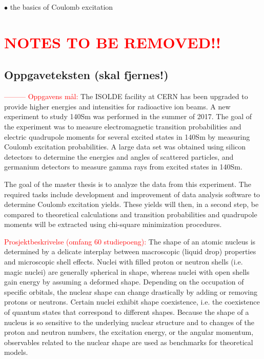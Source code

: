 \documentclass[twoside,english]{uiofysmaster/uiofysmaster}
\begin{document}
$\bullet$ the basics of Coulomb excitation 

\newpage

\chapter*{\textcolor{red}{NOTES TO BE REMOVED!!}}
\section{Oppgaveteksten (skal fjernes!)}
\textcolor{red}{---------} \newline
\textcolor{red}{Oppgavens mål:} \newline
The ISOLDE facility at CERN has been upgraded to provide higher energies and intensities for radioactive ion beams. A new experiment to study 140Sm was performed in the summer of 2017. The goal of the experiment was to measure electromagnetic transition probabilities and electric quadrupole moments for several excited states in 140Sm by measuring Coulomb excitation probabilities. A large data set was obtained using silicon detectors to determine the energies and angles of scattered particles, and germanium detectors to measure gamma rays from excited states in 140Sm. \newline

The goal of the master thesis is to analyze the data from this experiment. The required tasks include development and improvement of data analysis software to determine Coulomb excitation yields. These yields will then, in a second step, be compared to theoretical calculations and transition probabilities and quadrupole moments will be extracted using chi-square minimization procedures. \newline


\textcolor{red}{Prosjektbeskrivelse (omfang 60 studiepoeng):} \newline
The shape of an atomic nucleus is determined by a delicate interplay between macroscopic (liquid drop) properties and microscopic shell effects. Nuclei with filled proton or neutron shells (i.e. magic nuclei) are generally spherical in shape, whereas nuclei with open shells gain energy by assuming a deformed shape. Depending on the occupation of specific orbitals, the nuclear shape can change drastically by adding or removing protons or neutrons. Certain nuclei exhibit shape coexistence, i.e. the coexistence of quantum states that correspond to different shapes. Because the shape of a nucleus is so sensitive to the underlying nuclear structure and to changes of the proton and neutron numbers, the excitation energy, or the angular momentum, observables related to the nuclear shape are used as benchmarks for theoretical models. 
\end{document}
